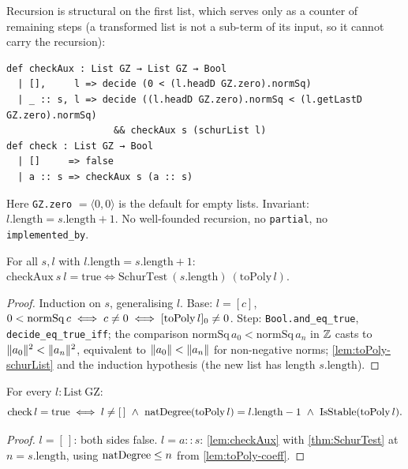 \begin{definition}\label{def:check}
Recursion is structural on the first list, which serves only as a counter of
remaining steps (a transformed list is not a sub-term of its input, so it
cannot carry the recursion):
\begin{verbatim}
def checkAux : List GZ → List GZ → Bool
  | [],     l => decide (0 < (l.headD GZ.zero).normSq)
  | _ :: s, l => decide ((l.headD GZ.zero).normSq < (l.getLastD GZ.zero).normSq)
                   && checkAux s (schurList l)
def check : List GZ → Bool
  | []     => false
  | a :: s => checkAux s (a :: s)
\end{verbatim}
Here \texttt{GZ.zero} $=\langle0,0\rangle$ is the default for empty lists.
Invariant: $l.\mathrm{length}=s.\mathrm{length}+1$. No well-founded recursion,
no \texttt{partial}, no \texttt{implemented\_by}.
\end{definition}

\begin{lemma}\label{lem:checkAux}
For all $s,l$ with $l.\mathrm{length}=s.\mathrm{length}+1$:
$\mathrm{checkAux}\ s\ l=\mathrm{true}\iff\mathrm{SchurTest}\ (s.\mathrm{length})\ (\mathrm{toPoly}\,l)$.
\end{lemma}
\begin{proof}
Induction on $s$, generalising $l$. Base: $l=[c]$, $0<\mathrm{normSq}\,c\iff
c\ne0\iff[\mathrm{toPoly}\,l]_{0}\ne0$. Step: \texttt{Bool.and\_eq\_true},
\texttt{decide\_eq\_true\_iff}; the comparison
$\mathrm{normSq}\,a_0<\mathrm{normSq}\,a_n$ in $\mathbb{Z}$ casts to
$\lVert a_0 \rVert^2<\lVert a_n \rVert^2$, equivalent to $\lVert a_0 \rVert<\lVert a_n \rVert$ for non-negative
norms; \ref{lem:toPoly-schurList} and the induction hypothesis (the new list has
length $s.\mathrm{length}$).
\end{proof}

\begin{theorem}\label{thm:check}
For every $l:\mathrm{List}\ \mathrm{GZ}$:
\[ \mathrm{check}\,l=\mathrm{true}\iff l\ne[\,]\ \wedge\ \natdeg(\mathrm{toPoly}\,l)=l.\mathrm{length}-1\ \wedge\ \stable(\mathrm{toPoly}\,l). \]
\end{theorem}
\begin{proof}
$l=[\,]$: both sides false. $l=a::s$: \ref{lem:checkAux} with
\ref{thm:SchurTest} at $n=s.\mathrm{length}$, using $\mathrm{natDegree}\le n$ from
\ref{lem:toPoly-coeff}.
\end{proof}

